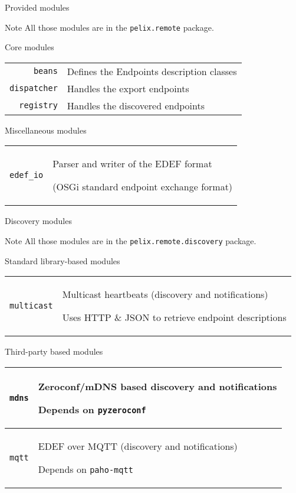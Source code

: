 \begin{frame}{Provided modules}
\begin{exampleblock}{Note}
All those modules are in the \texttt{pelix.remote} package.
\end{exampleblock}

\begin{block}{Core modules}
\begin{tabular}{rp{}}
\texttt{beans} & Defines the Endpoints description classes \\
\texttt{dispatcher} & Handles the export endpoints \\
\texttt{registry} & Handles the discovered endpoints \\
\end{tabular}
\end{block}

\begin{block}{Miscellaneous modules}
\begin{tabular}{rp{}}
\texttt{edef\_io} & Parser and writer of the EDEF format \par (OSGi standard endpoint exchange format) \\
\end{tabular}
\end{block}
\end{frame}


\begin{frame}{Discovery modules}
\begin{exampleblock}{Note}
All those modules are in the \texttt{pelix.remote.discovery} package.
\end{exampleblock}

\begin{block}{Standard library-based modules}
\begin{tabular}{rp{}}
\texttt{multicast} & Multicast heartbeats (discovery and notifications) \par Uses HTTP \& JSON to retrieve endpoint descriptions \\
\end{tabular}
\end{block}

\begin{block}{Third-party based modules}
\begin{tabular}{rp{}}
\texttt{mdns} & Zeroconf/mDNS based discovery and notifications \par Depends on \texttt{pyzeroconf} \\
\hline
\texttt{mqtt} & EDEF over MQTT (discovery and notifications) \par Depends on \texttt{paho-mqtt} \\
\end{tabular}
\end{block}
\end{frame}

